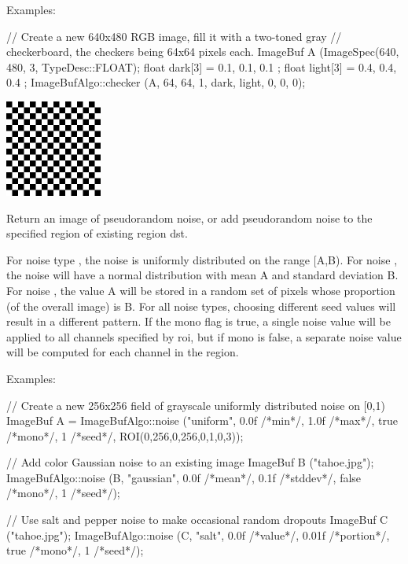 \smallskip
\noindent Examples:
\begin{code}
    // Create a new 640x480 RGB image, fill it with a two-toned gray
    // checkerboard, the checkers being 64x64 pixels each.
    ImageBuf A (ImageSpec(640, 480, 3, TypeDesc::FLOAT);
    float dark[3] = { 0.1, 0.1, 0.1 };
    float light[3] = { 0.4, 0.4, 0.4 };
    ImageBufAlgo::checker (A, 64, 64, 1, dark, light, 0, 0, 0);
\end{code}
\spc \includegraphics[width=1.25in]{figures/checker.jpg}  \\
\apiend



Return an image of pseudorandom noise, or add pseudorandom noise
to the specified region of existing region {\cf dst}.

For noise type , the noise is uniformly distributed on the
range {\cf [A,B)}. For noise , the noise will have a normal
distribution with mean A and standard deviation B. For noise , the
value A will be stored in a random set of pixels whose proportion (of the
overall image) is B. For all noise types, choosing different {\cf seed}
values will result in a different pattern. If the {\cf mono} flag is {\cf
true}, a single noise value will be applied to all channels specified by
{\cf roi}, but if {\cf mono} is {\cf false}, a separate noise value will be
computed for each channel in the region.

\smallskip
\noindent Examples:
\begin{code}
    // Create a new 256x256 field of grayscale uniformly distributed noise on [0,1)
    ImageBuf A = ImageBufAlgo::noise ("uniform", 0.0f /*min*/, 1.0f /*max*/,
                         true /*mono*/, 1 /*seed*/, ROI(0,256,0,256,0,1,0,3));

    // Add color Gaussian noise to an existing image
    ImageBuf B ("tahoe.jpg");
    ImageBufAlgo::noise (B, "gaussian", 0.0f /*mean*/, 0.1f /*stddev*/,
                         false /*mono*/, 1 /*seed*/);

    // Use salt and pepper noise to make occasional random dropouts
    ImageBuf C ("tahoe.jpg");
    ImageBufAlgo::noise (C, "salt", 0.0f /*value*/, 0.01f /*portion*/,
                         true /*mono*/, 1 /*seed*/);
\end{code}


